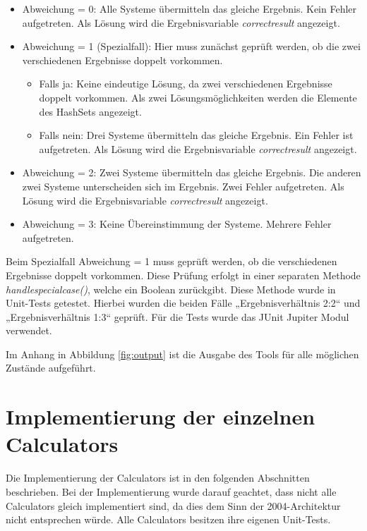  \begin{itemize}
     \item Abweichung = 0: Alle Systeme übermitteln das gleiche Ergebnis. Kein Fehler aufgetreten. Als Lösung wird die Ergebnisvariable \textit{correct\textunderscore result} angezeigt.
     \item Abweichung = 1 (Spezialfall): Hier muss zunächst geprüft werden, ob die zwei verschiedenen Ergebnisse doppelt vorkommen.
     \begin{itemize}
         \item Falls ja: Keine eindeutige Lösung, da zwei verschiedenen Ergebnisse doppelt vorkommen. Als zwei Lösungsmöglichkeiten werden die Elemente des HashSets angezeigt.
         \item Falls nein: Drei Systeme übermitteln das gleiche Ergebnis. Ein Fehler ist aufgetreten. Als Lösung wird die Ergebnisvariable \textit{correct\textunderscore result} angezeigt.
     \end{itemize}
     \item Abweichung = 2: Zwei Systeme übermitteln das gleiche Ergebnis. Die anderen zwei Systeme unterscheiden sich im Ergebnis. Zwei Fehler aufgetreten. Als Lösung wird die Ergebnisvariable \textit{correct\textunderscore result} angezeigt.
     \item Abweichung = 3: Keine Übereinstimmung der Systeme. Mehrere Fehler aufgetreten.
\end{itemize}
	
Beim Spezialfall Abweichung = 1 muss geprüft werden, ob die verschiedenen Ergebnisse doppelt vorkommen. Diese Prüfung erfolgt in einer separaten Methode \textit{handle\textunderscore special\textunderscore case()}, welche ein Boolean zurückgibt. Diese Methode wurde in Unit-Tests getestet. Hierbei wurden die beiden Fälle „Ergebnisverhältnis 2:2“ und „Ergebnisverhältnis 1:3“ geprüft. Für die Tests wurde das JUnit Jupiter Modul verwendet.

Im Anhang in Abbildung \ref{fig:output} ist die Ausgabe des Tools für alle möglichen Zustände aufgeführt.

\section{Implementierung der einzelnen Calculators}
Die Implementierung der Calculators ist in den folgenden Abschnitten beschrieben. Bei der Implementierung wurde darauf geachtet, dass nicht alle Calculators gleich implementiert sind, da dies dem Sinn der 2004-Architektur nicht entsprechen würde. Alle Calculators besitzen ihre eigenen Unit-Tests. 

